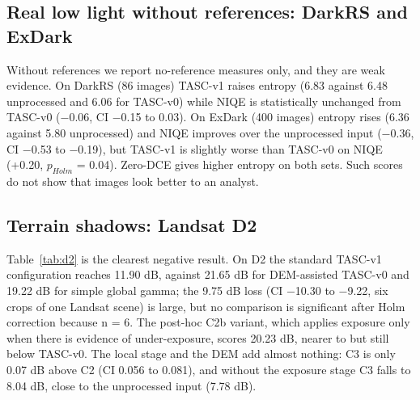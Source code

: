 \documentclass[conference]{IEEEtran}
\begin{document}
\subsection{Real low light without references: DarkRS and ExDark}
Without references we report no-reference measures only, and they are weak evidence. On DarkRS (86 images) TASC-v1 raises entropy (6.83 against 6.48 unprocessed and 6.06 for TASC-v0) while NIQE is statistically unchanged from TASC-v0 ($-0.06$, CI $-$0.15 to 0.03). On ExDark (400 images) entropy rises (6.36 against 5.80 unprocessed) and NIQE improves over the unprocessed input ($-$0.36, CI $-$0.53 to $-$0.19), but TASC-v1 is slightly worse than TASC-v0 on NIQE (+0.20, $p_{Holm}$ = 0.04). Zero-DCE gives higher entropy on both sets. Such scores do not show that images look better to an analyst.

\subsection{Terrain shadows: Landsat D2}
Table~\ref{tab:d2} is the clearest negative result. On D2 the standard TASC-v1 configuration reaches 11.90 dB, against 21.65 dB for DEM-assisted TASC-v0 and 19.22 dB for simple global gamma; the 9.75 dB loss (CI $-$10.30 to $-$9.22, six crops of one Landsat scene) is large, but no comparison is significant after Holm correction because n = 6. The post-hoc C2b variant, which applies exposure only when there is evidence of under-exposure, scores 20.23 dB, nearer to but still below TASC-v0. The local stage and the DEM add almost nothing: C3 is only 0.07 dB above C2 (CI 0.056 to 0.081), and without the exposure stage C3 falls to 8.04 dB, close to the unprocessed input (7.78 dB).
\end{document}
